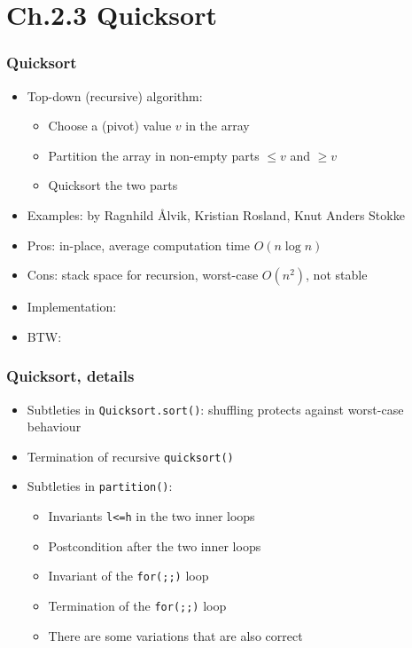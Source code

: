 \documentclass[handout]{beamer}
\newcommand{\git}{https://github.com/marcbezem/INF102/blob/master}
\begin{document}
\section{Ch.2.3 Quicksort}

\begin{frame}
    \frametitle{Quicksort}

\begin{itemize}[<+->]
\item Top-down (recursive) algorithm:
  \begin{itemize}[<+->]
  \item Choose a (pivot)  value $v$ in the array
  \item Partition the array in non-empty parts $\leq v$ and $\geq v$
  \item Quicksort the two parts
  \end{itemize}     
\item Examples: \href{https://bitbucket.org/algoritmevisualisering/algoritmevisualisering}%
{{\color{red}{algoritmevisualisering}}} by Ragnhild \AA lvik, Kristian Rosland, Knut Anders Stokke
\item Pros: in-place, average computation time $O(n\log n)$
\item Cons: stack space for recursion, worst-case $O(n^2)$, not stable
\item Implementation:
\href{\git/programs/sorting/quickSort/QuickSort.java}%
{\color{red}{QuickSort.java}}
\item BTW: \href{http://www.envisage-project.eu/proving-android-java-and-python-sorting-algorithm-is-broken-and-how-to-fix-it/}%
{\color{red}{Bug in java.util.Arrays.sort}}
\end{itemize}     
\end{frame}

\begin{frame}
    \frametitle{Quicksort, details}

\begin{itemize}[<+->]

\item Subtleties in {\tt Quicksort.sort()}: shuffling protects against worst-case behaviour
\item Termination of recursive {\tt quicksort()}
\item Subtleties in {\tt partition()}:
  \begin{itemize}[<+->]
  \item Invariants {\tt l<=h} in the two inner loops
  \item Postcondition after the two inner loops
  \item Invariant of the {\tt for(;;)} loop
  \item Termination of the {\tt for(;;)} loop
  \item There are some variations that are also correct
  \end{itemize}    

\end{itemize}     
\end{frame}
\end{document}
